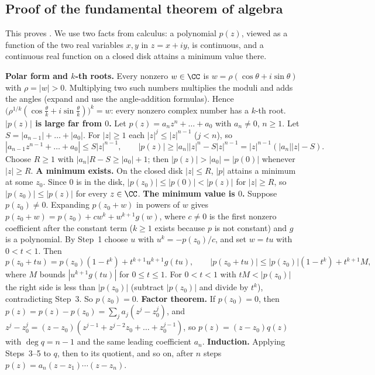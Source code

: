 \documentclass[10pt]{scrartcl}
\begin{document}
\subsection{Proof of the fundamental theorem of algebra}
This proves . We use two facts from calculus: a polynomial $p(z)$, viewed as a function of the two real variables $x,y$ in $z=x+iy$, is continuous, and a continuous real function on a closed disk attains a minimum value there.

\begin{steps}
  \ii \textbf{Polar form and $k$-th roots.} Every nonzero $w\in\CC$ is $w=\rho(\cos\theta+i\sin\theta)$ with $\rho=|w|>0$. Multiplying two such numbers multiplies the moduli and adds the angles (expand and use the angle-addition formulas). Hence $\bigl(\rho^{1/k}(\cos\tfrac{\theta}{k}+i\sin\tfrac{\theta}{k})\bigr)^k=w$: every nonzero complex number has a $k$-th root.
  \ii \textbf{$|p(z)|$ is large far from $0$.} Let $p(z)=a_nz^n+\dots+a_0$ with $a_n\ne0$, $n\ge1$. Let $S=|a_{n-1}|+\dots+|a_0|$. For $|z|\ge1$ each $|z|^j\le|z|^{n-1}$ ($j<n$), so
  \[
    |a_{n-1}z^{n-1}+\dots+a_0|\le S|z|^{n-1},\qquad |p(z)|\ge|a_n||z|^n-S|z|^{n-1}=|z|^{n-1}(|a_n||z|-S).
  \] Choose $R\ge1$ with $|a_n|R-S\ge|a_0|+1$; then $|p(z)|>|a_0|=|p(0)|$ whenever $|z|\ge R$.
  \ii \textbf{A minimum exists.} On the closed disk $|z|\le R$, $|p|$ attains a minimum at some $z_0$. Since $0$ is in the disk, $|p(z_0)|\le|p(0)|<|p(z)|$ for $|z|\ge R$, so $|p(z_0)|\le|p(z)|$ for every $z\in\CC$.
  \ii \textbf{The minimum value is $0$.} Suppose $p(z_0)\ne0$. Expanding $p(z_0+w)$ in powers of $w$ gives $p(z_0+w)=p(z_0)+cw^k+w^{k+1}g(w)$, where $c\ne0$ is the first nonzero coefficient after the constant term ($k\ge1$ exists because $p$ is not constant) and $g$ is a polynomial. By Step~1 choose $u$ with $u^k=-p(z_0)/c$, and set $w=tu$ with $0<t<1$. Then
  \[
    p(z_0+tu)=p(z_0)(1-t^k)+t^{k+1}u^{k+1}g(tu),\qquad |p(z_0+tu)|\le|p(z_0)|(1-t^k)+t^{k+1}M,
  \]
  where $M$ bounds $|u^{k+1}g(tu)|$ for $0\le t\le1$. For $0<t<1$ with $tM<|p(z_0)|$ the right side is less than $|p(z_0)|$ (subtract $|p(z_0)|$ and divide by $t^k$), contradicting Step~3. So $p(z_0)=0$.
  \ii \textbf{Factor theorem.} If $p(z_0)=0$, then $p(z)=p(z)-p(z_0)=\sum_j a_j(z^j-z_0^j)$, and $z^j-z_0^j=(z-z_0)(z^{j-1}+z^{j-2}z_0+\dots+z_0^{j-1})$, so $p(z)=(z-z_0)q(z)$ with $\deg q=n-1$ and the same leading coefficient $a_n$.
  \ii \textbf{Induction.} Applying Steps~3--5 to $q$, then to its quotient, and so on, after $n$ steps $p(z)=a_n(z-z_1)\cdots(z-z_n)$.
\end{steps}
\end{document}
